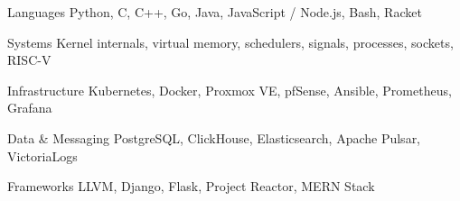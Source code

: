 
\begin{cvskills}
  \cvskill
    {Languages} %
    {Python, C, C++, Go, Java, JavaScript / Node.js, Bash, Racket} %

  \cvskill
    {Systems} %
    {Kernel internals, virtual memory, schedulers, signals, processes, sockets, RISC-V} %

  \cvskill
    {Infrastructure} %
    {Kubernetes, Docker, Proxmox VE, pfSense, Ansible, Prometheus, Grafana} %

  \cvskill
    {Data \& Messaging} %
    {PostgreSQL, ClickHouse, Elasticsearch, Apache Pulsar, VictoriaLogs} %

  \cvskill
    {Frameworks} %
    {LLVM, Django, Flask, Project Reactor, MERN Stack} %
\end{cvskills}
